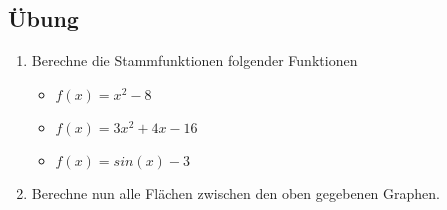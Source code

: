 \subsection{Übung}
\begin{enumerate}
\item Berechne die Stammfunktionen folgender Funktionen
\begin{itemize}
\item $f(x)=x^2-8$
\item $f(x)=3x^2+4x-16$
\item $f(x)=sin(x)-3$
\end{itemize}
\item Berechne nun alle Flächen zwischen den oben gegebenen Graphen.
\end{enumerate}